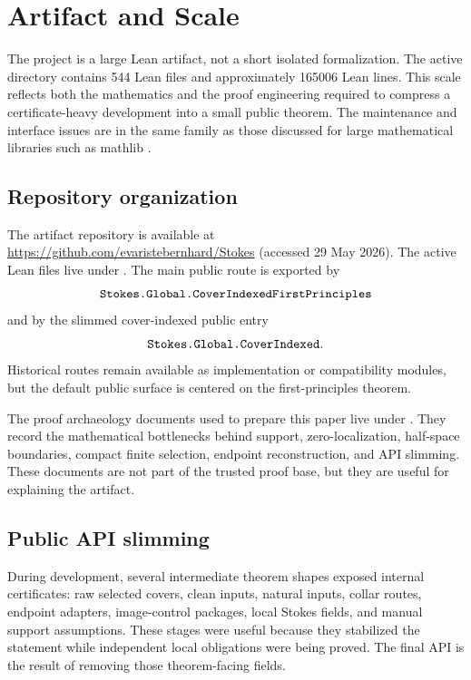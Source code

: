 \section{Artifact and Scale}
\label{sec:artifact-scale}

The project is a large Lean artifact, not a short isolated formalization.  The
active  directory contains 544 Lean files and approximately
165006 Lean lines.  This scale reflects both the mathematics and the proof
engineering required to compress a certificate-heavy development into a small
public theorem.  The maintenance and interface issues are in the same family
as those discussed for large mathematical libraries such as mathlib
\cite{vandoorn2020maintaining,baanen2022instance,baanen2025growing}.

\subsection{Repository organization}

The artifact repository is available at
\url{https://github.com/evaristebernhard/Stokes} (accessed 29 May 2026).
The active Lean files live under .  The main public route is
exported by
\[
\code{Stokes.Global.CoverIndexedFirstPrinciples}
\]
and by the slimmed cover-indexed public entry
\[
\code{Stokes.Global.CoverIndexed}.
\]
Historical routes remain available as implementation or compatibility modules,
but the default public surface is centered on the first-principles theorem.

The proof archaeology documents used to prepare this paper live under
.  They record the mathematical bottlenecks
behind support, zero-localization, half-space boundaries, compact finite
selection, endpoint reconstruction, and API slimming.  These documents are not
part of the trusted proof base, but they are useful for explaining the
artifact.

\subsection{Public API slimming}

During development, several intermediate theorem shapes exposed internal
certificates: raw selected covers, clean inputs, natural inputs, collar routes,
endpoint adapters, image-control packages, local Stokes fields, and manual
support assumptions.  These stages were useful because they stabilized the
statement while independent local obligations were being proved.  The final
API is the result of removing those theorem-facing fields.

